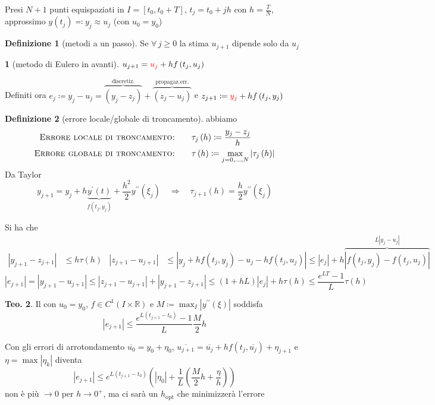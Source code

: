 \documentclass[a4paper,10pt]{article}
\theoremstyle{definition}
\newcommand{\noun}[1]{\textsc{#1}}
\theoremstyle{indentdefinition}
\newtheorem{defn}{Definizione}[section]
\theoremstyle{indenttheorem}
\newtheorem{thm}{Teo.}
\theoremstyle{myremark}
\theoremstyle{indentgeneral}
\newtheorem{lyxalgorithm}[thm]{\protect\algorithmname}
\theoremstyle{plain}
\theoremstyle{plain}
\begin{document}
Presi $N+1$ punti equispaziati in $I=\left[t_{0},t_{0}+T\right]$,
$t_{j}=t_{0}+jh$ con $h=\frac{T}{N}$, approssimo $y\left(t_{j}\right)\eqqcolon y_{j}\approx u_{j}$
(con $u_{0}=y_{0}$)
\begin{defn}[metodi a un passo]
Se $\forall\,j\geq0$ la stima $u_{j+1}$ dipende solo da $u_{j}$
\end{defn}

\begin{lyxalgorithm}[metodo di Eulero in avanti]
\label{alg:metodo-eulero-avanti}$u_{j+1}=\textcolor{red}{u_{j}}+hf\left(t_{j},u_{j}\right)$
\end{lyxalgorithm}

Definiti ora $e_{j}\coloneqq y_{j}-u_{j}=\overbrace{\left(y_{j}-z_{j}\right)}^{\text{discretiz.}}+  \overbrace{\left(z_{j}-u_{j}\right)}^{\text{propagaz.err.}}$
e $z_{j+1}\coloneqq \textcolor{red}{y_{j}}+hf\left(t_{j},y_{j}\right)$


\begin{defn}[errore locale/globale di troncamento] abbiamo
\begin{align*}
    \noun{Errore locale di troncamento:} & \qquad\tau_{j}\left(h\right)\coloneqq\frac{y_{j}-z_{j}}{h} \\
    \noun{Errore globale di troncamento:} & \qquad\tau\left(h\right)\coloneqq\max_{j=0,\dots,N}\left|\tau_{j}\left(h\right)\right|
\end{align*}
Da Taylor
\[
y_{j+1}=y_{j}+h\underset{f\left(t_{j},y_{j}\right)}{\underbrace{y^{\prime}\left(t\right)}}+\frac{h^{2}}{2}y^{\prime\prime}\left(\xi_{j}\right)\quad\Rightarrow\quad\tau_{j+1}\left(h\right)=\frac{h}{2}y^{\prime\prime}\left(\xi_{j}\right)
\]
\end{defn}
Si ha che
\begin{align*}
\left|y_{j+1}-z_{j+1}\right| & \leq h\tau\left(h\right) & \left|z_{j+1}-u_{j+1}\right| & \leq\left|y_{j}+hf\left(t_{j},y_{j}\right)-u_{j}-hf\left(t_{j},u_{j}\right)\right|\leq\left|e_{j}\right|+h\overset{L\left|y_{j}-u_{j}\right|}{\overbrace{\left|f\left(t_{j},y_{j}\right)-f\left(t_{j},u_{j}\right)\right|}}
\end{align*}
\[
\left|e_{j+1}\right|=\left|y_{j+1}-u_{j+1}\right|\leq\left|z_{j+1}-u_{j+1}\right|+\left|y_{j+1}-z_{j+1}\right|\leq\left(1+hL\right)\left|e_{j}\right|+h\tau\left(h\right)\leq\frac{e^{LT}-1}{L}\tau\left(h\right)
\]

\begin{thm}
Il  con $u_{0}=y_{0}$, $f\in C^{1}\left(I\times\mathbb{R}\right)$
e $M\coloneqq\max_{I}\left|y^{\prime\prime}\left(\xi\right)\right|$
soddisfa 
\[
\left|e_{j+1}\right|\leq\frac{e^{L\left(t_{j+1}-t_{0}\right)}-1}{L}\frac{M}{2}h
\]

Con gli errori di arrotondamento $\overline{u_{0}}=y_{0}+\eta_{0}$,
$\overline{u_{j+1}}=\overline{u_{j}}+hf\left(t_{j},\overline{u_{j}}\right)+\eta_{j+1}$
e $\eta=\max\left|\eta_{k}\right|$ diventa 
\[
\left|e_{j+1}\right|\leq e^{L\left(t_{j+1}-t_{0}\right)}\left(\left|\eta_{0}\right|+\frac{1}{L}\left(\frac{M}{2}h+\frac{\eta}{h}\right)\right)
\]
non è più $\rightarrow0$ per $h\rightarrow0^{+}$, ma ci sarà un
$h_{\text{opt}}$ che minimizzerà l'errore
\end{thm}
\end{document}
